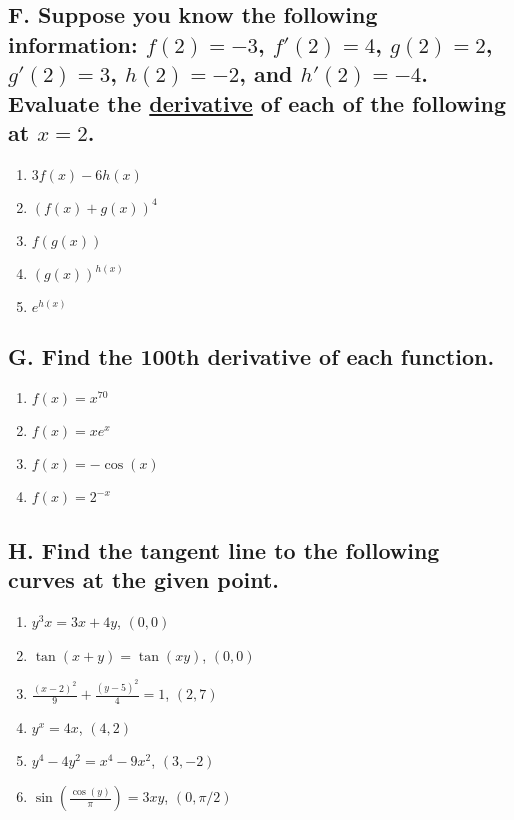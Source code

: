 \documentclass{article}
\begin{document}
\subsection*{F. Suppose you know the following information: $f(2)=-3$, $f'(2)=4$, $g(2)=2$, $g'(2)=3$, $h(2)=-2$, and $h'(2)=-4$. Evaluate the \underline{derivative} of each of the following at $x=2$.}
\begin{multicols}{5}
\begin{enumerate}
\item $3f(x)-6h(x)$ 
\item $(f(x)+g(x))^4$
\item $f(g(x))$
\item $(g(x))^{h(x)}$
\item $e^{h(x)}$
\end{enumerate}
\end{multicols}


\subsection*{G. Find the 100th derivative of each function.}
\begin{multicols}{4}
\begin{enumerate}
\item $f(x)=x^{70}$
\item $f(x)=xe^{x}$
\item $f(x)=-\cos(x)$
\item $f(x)=2^{-x}$
\end{enumerate}
\end{multicols}


\subsection*{H. Find the tangent line to the following curves at the given point.}

\begin{multicols}{3}
\begin{enumerate}
\item $y^{3}x=3x+4y$, $(0,0)$
\item $\tan\left(x+y\right)=\tan\left(xy\right)$, $(0,0)$
\item $\frac{\left(x-2\right)^{2}}{9}+\frac{\left(y-5\right)^{2}}{4}=1$, $(2,7)$
\item $y^{x}=4x$, $(4,2)$
\item $y^{4}-4y^{2}=x^{4}-9x^{2}$, $(3,-2)$
\item $\sin\left(\frac{\cos\left(y\right)}{\pi}\right)=3xy$, $(0,\pi/2)$
\end{enumerate}
\end{multicols}
\end{document}
